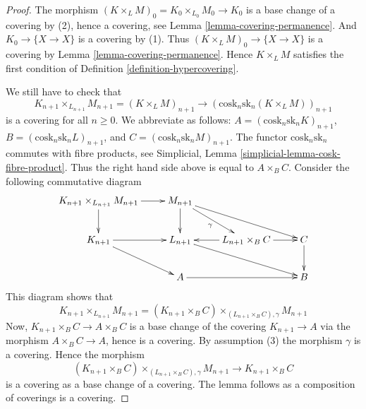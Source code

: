 \documentclass[10pt,a4paper]{amsart}
\theoremstyle{plain}
\theoremstyle{definition}
\theoremstyle{remark}
\numberwithin{equation}{subsection}
\begin{document}
\begin{proof}
The morphism $(K \times_L M)_0 = K_0 \times_{L_0} M_0 \to K_0$
is a base change of a covering by (2), hence a covering, see
Lemma \ref{lemma-covering-permanence}. And $K_0 \to \{X \to X\}$
is a covering by (1). Thus $(K \times_L M)_0 \to \{X \to X\}$
is a covering by Lemma \ref{lemma-covering-permanence}. Hence
$K \times_L M$ satisfies the first condition of Definition
\ref{definition-hypercovering}.

\medskip\noindent
We still have to check that
$$
K_{n + 1} \times_{L_{n + 1}} M_{n + 1} = (K \times_L M)_{n + 1}
\longrightarrow
(\text{cosk}_n \text{sk}_n (K \times_L M))_{n + 1}
$$
is a covering for all $n \geq 0$. We abbreviate as follows:
$A = (\text{cosk}_n \text{sk}_n K)_{n + 1}$,
$B = (\text{cosk}_n \text{sk}_n L)_{n + 1}$, and
$C = (\text{cosk}_n \text{sk}_n M)_{n + 1}$.
The functor $\text{cosk}_n \text{sk}_n$ commutes with fibre products,
see Simplicial, Lemma \ref{simplicial-lemma-cosk-fibre-product}.
Thus the right hand side above is equal to $A \times_B C$.
Consider the following commutative diagram
$$
\xymatrix{
K_{n + 1} \times_{L_{n + 1}} M_{n + 1} \ar[r] \ar[d] &
M_{n + 1} \ar[d] \ar[rd]_\gamma \ar[rrd] &
& \\
K_{n + 1} \ar[r] \ar[rd] &
L_{n + 1} \ar[rrd] &
L_{n + 1} \times_B C \ar[l] \ar[r] &
C \ar[d] \\
&
A \ar[rr] &
&
B
}
$$
This diagram shows that
$$
K_{n + 1} \times_{L_{n + 1}} M_{n + 1}
=
(K_{n + 1} \times_B C)
\times_{(L_{n + 1} \times_B C), \gamma}
M_{n + 1}
$$
Now, $K_{n + 1} \times_B C \to A \times_B C$
is a base change of the covering $K_{n + 1} \to A$
via the morphism $A \times_B C \to A$, hence is a
covering. By assumption (3) the morphism $\gamma$ is a covering.
Hence the morphism
$$
(K_{n + 1} \times_B C)
\times_{(L_{n + 1} \times_B C), \gamma}
M_{n + 1}
\longrightarrow
K_{n + 1} \times_B C
$$
is a covering as a base change of a covering.
The lemma follows as a composition of coverings
is a covering.
\end{proof}
\end{document}
